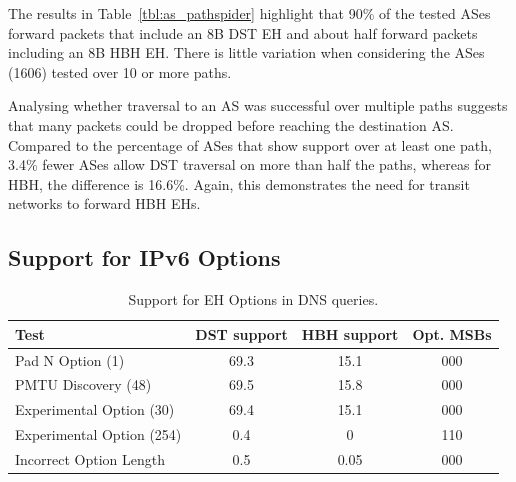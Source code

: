 \documentclass[conference]{IEEEtran}
\begin{document}




The results in Table~\ref{tbl:as_pathspider} highlight that 90\% of the tested ASes forward packets that include an  8B DST EH
 and about half forward packets including an
8B HBH EH.  There is little variation when considering the ASes (1606) tested over 10 or more paths.  

Analysing whether traversal to an AS was successful over multiple paths suggests that many packets could be
dropped before reaching the destination AS. Compared to the percentage of ASes that show support over at least one path, 3.4\% fewer ASes allow DST traversal on more than half the paths, whereas for HBH, the
difference is 16.6\%. Again, this demonstrates the need for  transit 
networks to forward HBH EHs. 

\subsection{Support for IPv6 Options}

\begin{table}[t]
\centering 
\caption{Support for EH Options in DNS queries.}
\begin{tabular}{l|c|c|c}
Test                      & DST support & HBH support & Opt. MSBs\\
\hline \hline
Pad N Option (1)          & 69.3        & 15.1   & 000    \\
PMTU Discovery (48)       & 69.5        & 15.8    & 000   \\
Experimental Option (30)  & 69.4        & 15.1   & 000    \\
Experimental Option (254) & 0.4         & 0      & 110    \\
Incorrect Option Length   & 0.5         & 0.05    &   000     
\end{tabular}
\label{tbl:option_type_support}
\end{table}
\end{document}
